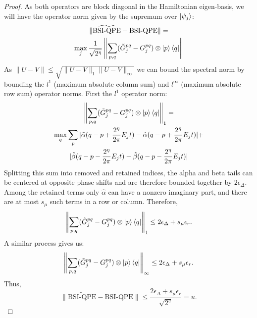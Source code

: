 \documentclass[aps,floatfix,10pt,amssymb,amsfont,amsmath,superscriptaddress,float,nofootinbib,longbibliography,nobalancelastpage,twocolumn]{revtex4-2}
\begin{document}
\begin{proof}
    As both operators are block diagonal in the Hamiltonian eigen-basis, we will have the operator norm given by the supremum over $\ket{\psi_j}$:
    \begin{multline}
        \|\widetilde{\text{BSI-QPE}}-\text{BSI-QPE}\| =\\ \max_j\frac{1}{\sqrt{2^{\eta}}} 
        \left\|\sum_{p,q}(\tilde G^{pq}_j - G^{pq}_j) \otimes \ket{p}\bra{q}\right\|
    \end{multline}
    As $\|U-V\| \leq \sqrt{\|U-V\|_{1}\|U-V\|_{\infty}}$ we can bound the spectral norm by bounding the $l^1$ (maximum absolute column sum) and $l^{\infty}$ (maximum absolute row sum) operator norms. First the $l^1$ operator norm:
    \begin{multline}
         \left\|\sum_{p,q}(\tilde G^{pq}_j - G^{pq}_j) \otimes \ket{p}\bra{q}\right\|_1 =\\ \max_q\sum_{p}|\tilde\alpha(q-p+\frac{2^{\eta}}{2\pi}E_jt)-\hat\alpha(q-p+\frac{2^{\eta}}{2\pi}E_jt)|+\\|\tilde\beta (q-p-\frac{2^{\eta}}{2\pi}E_jt)-\hat\beta (q-p-\frac{2^{\eta}}{2\pi}E_jt)|
    \end{multline}
    Splitting this sum into removed and retained indices, the alpha and beta
    tails can be centered at opposite phase shifts and are therefore bounded
    together by $2\epsilon_\Delta$.  Among the retained terms only
    $\hat\alpha$ can have a nonzero imaginary part, and there are at most
    $s_\mu$ such terms in a row or column.  Therefore,
    \begin{equation}
        \left\|\sum_{p,q}(\tilde G^{pq}_j - G^{pq}_j) \otimes \ket{p}\bra{q}\right\|_1 \leq2\epsilon_\Delta+s_\mu\epsilon_r.
    \end{equation}
    A similar process gives us:
    \begin{equation}
        \left\|\sum_{p,q}(\tilde G^{pq}_j - G^{pq}_j) \otimes \ket{p}\bra{q}\right\|_{\infty} \leq2\epsilon_\Delta+s_\mu\epsilon_r.
    \end{equation}
    Thus,
    \begin{equation}
        \|\widetilde{\text{BSI-QPE}}-\text{BSI-QPE}\| \leq
        \frac{2\epsilon_{\Delta}+s_\mu\epsilon_r}{\sqrt{2^{\eta}}}=u.
    \end{equation}
\end{proof}

\end{document}
